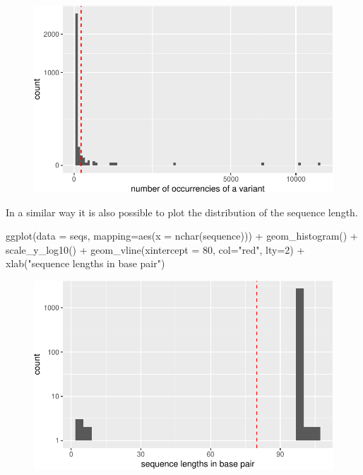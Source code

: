 \documentclass[
  letterpaper,
  DIV=11,
  numbers=noendperiod]{scrreprt}
\newenvironment{Shaded}{\begin{snugshade}}{\end{snugshade}}
\newcommand{\AttributeTok}[1]{\textcolor[rgb]{0.40,0.45,0.13}{#1}}
\newcommand{\DecValTok}[1]{\textcolor[rgb]{0.68,0.00,0.00}{#1}}
\newcommand{\FunctionTok}[1]{\textcolor[rgb]{0.28,0.35,0.67}{#1}}
\newcommand{\NormalTok}[1]{\textcolor[rgb]{0.00,0.23,0.31}{#1}}
\newcommand{\SpecialCharTok}[1]{\textcolor[rgb]{0.37,0.37,0.37}{#1}}
\newcommand{\StringTok}[1]{\textcolor[rgb]{0.13,0.47,0.30}{#1}}
\begin{document}
\begin{figure}[H]

{\centering \includegraphics{./tutorial_files/figure-pdf/unnamed-chunk-9-1.pdf}

}

\end{figure}

In a similar way it is also possible to plot the distribution of the
sequence length.

\begin{Shaded}
\begin{Highlighting}[]
\FunctionTok{ggplot}\NormalTok{(}\AttributeTok{data =}\NormalTok{ seqs,  }\AttributeTok{mapping=}\FunctionTok{aes}\NormalTok{(}\AttributeTok{x =} \FunctionTok{nchar}\NormalTok{(sequence))) }\SpecialCharTok{+}
  \FunctionTok{geom\_histogram}\NormalTok{() }\SpecialCharTok{+}
  \FunctionTok{scale\_y\_log10}\NormalTok{() }\SpecialCharTok{+}
  \FunctionTok{geom\_vline}\NormalTok{(}\AttributeTok{xintercept =} \DecValTok{80}\NormalTok{, }\AttributeTok{col=}\StringTok{"red"}\NormalTok{, }\AttributeTok{lty=}\DecValTok{2}\NormalTok{) }\SpecialCharTok{+}
  \FunctionTok{xlab}\NormalTok{(}\StringTok{"sequence lengths in base pair"}\NormalTok{)}
\end{Highlighting}
\end{Shaded}

\begin{figure}[H]

{\centering \includegraphics{./tutorial_files/figure-pdf/unnamed-chunk-10-1.pdf}

}

\end{figure}
\end{document}
